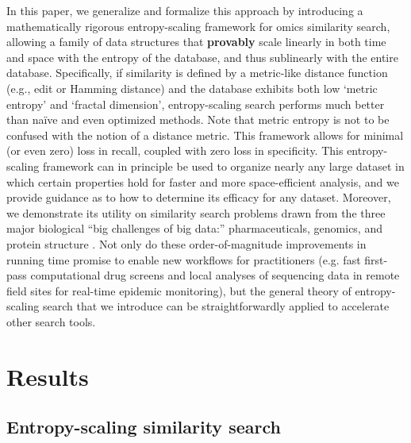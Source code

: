\documentclass[review,preprint,12pt]{elsarticle}
\renewcommand{\cite}{\citep} %
\theoremstyle{definition}
\theoremstyle{remark}
\numberwithin{equation}{section}
\begin{document}
In this paper, we generalize and formalize this approach by introducing 
a mathematically rigorous entropy-scaling framework for 
omics similarity search, allowing a family of data structures that \textbf{provably} scale linearly in both time and space with the entropy of the database, and thus sublinearly with the entire database.
Specifically, if similarity is defined by a metric-like distance function (e.g., edit or Hamming distance) and the database exhibits both low `metric entropy' and `fractal dimension', entropy-scaling search performs much better than na\"ive and even optimized methods.
Note that metric entropy is not to be confused with the notion of a distance metric.
This framework allows for minimal (or even zero) loss in recall, coupled
with zero loss in specificity.
This entropy-scaling framework can in principle be used to organize nearly any large dataset in which certain properties hold for faster and more space-efficient analysis,
and we provide guidance as to how to determine its efficacy for any dataset.
Moreover, we demonstrate its utility on similarity search problems drawn from the three major biological ``big challenges of big data:'' pharmaceuticals, genomics, and protein structure \cite{marx2013biology}.
Not only do these order-of-magnitude improvements in running time promise to enable new workflows for practitioners (e.g. fast first-pass computational drug screens and local analyses of sequencing data in remote field sites for real-time epidemic monitoring), but the general theory of entropy-scaling search that we introduce can be straightforwardly applied to accelerate other search tools.

\section{Results}

\subsection{Entropy-scaling similarity search}
\end{document}
